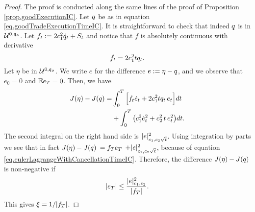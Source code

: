\documentclass[10pt,a4paper]{article}
\begin{document}
	\begin{proof}
		The proof is conducted along the same lines of the proof of Proposition \ref{prop.goodExecutionIC}.
		Let $q$ be as in equation \eqref{eq.goodTradeExecutionTimeIC}. It is straightforward to check that indeed $q$ is in $\mathcal{U}^{0,\mathfrak{q_0}}$. 
		 Let $f_t:= 2c_{1}^{2} \dot{q}_{t} + S_t$ and notice that $f$ is absolutely continuous with derivative 
		\begin{equation}\label{eq.eulerLagrangeWithCancellationTimeIC}
		\dot{f}_t = 2 c_{1}^{2} t q_t .
		\end{equation}
		Let $\eta$ be in $\mathcal{U}^{0,\mathfrak{q_0}}$. We write $e$ for the difference $e:=\eta-q$, and we observe that $e_0=0$ and $\mathbb{{E}} e_T = 0$.  Then, we have 
		\begin{equation*}
		\begin{split}
		J(\eta) - J(q) = &
		\int_{0}^{T} \Big[ f_t \dot{e}_t + 2c_{1}^{2} t q_t \, e_t\Big]dt\\
		&+\int_{0}^{T}\big(c_{1}^{2} \dot{e}_t^{2} + c_{2}^{2} \, t \, e^{2}_t \big)dt.
		\end{split}
		\end{equation*}
		The second integral on the right hand side is $ \lvert e \rvert_{c_{1},c_{2}\sqrt{t}}^{2}$.  
		Using integration by parts we see that in fact $J(\eta) - J(q) $ $= f_T e_T $ $ + \lvert e \rvert_{c_{1},c_{2}\sqrt{t}}^{2}$, because of equation \eqref{eq.eulerLagrangeWithCancellationTimeIC}.  
		Therefore, the difference $J(\eta) - J(q) $ is non-negative if 
		\begin{equation*}
		\left\lvert {e_T} \right\rvert
		\leq \frac{ \lvert e \rvert_{c_{1},c_{2}}^{2}}{\left\lvert {f_T} \right\rvert}.
		\end{equation*}
		This gives $\xi = 1/\lvert f_T\rvert$.
		

\end{proof}
\end{document}
